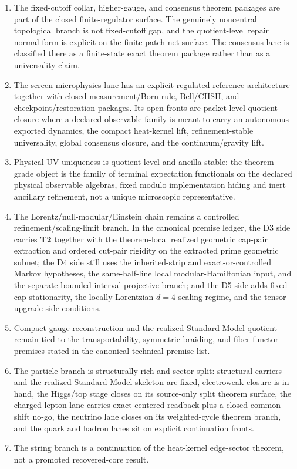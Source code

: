 \begin{enumerate}[leftmargin=2em]
\item The fixed-cutoff collar, higher-gauge, and consensus theorem packages are part of
the closed finite-regulator surface. The genuinely noncentral topological branch is not
fixed-cutoff gap, and the quotient-level repair normal form is explicit on the finite patch-net
surface. The consensus lane is classified there as a finite-state exact theorem package rather
than as a universality claim.
\item The screen-microphysics lane has an explicit regulated reference architecture together
with closed measurement/Born-rule, Bell/CHSH, and checkpoint/restoration packages. Its open fronts
are packet-level quotient closure where a declared observable family is meant to carry an
autonomous exported dynamics, the compact heat-kernel lift, refinement-stable universality,
global consensus closure, and the continuum/gravity lift.
\item Physical UV uniqueness is quotient-level and ancilla-stable: the theorem-grade object is
the family of terminal expectation functionals on the declared physical observable algebras, fixed
modulo implementation hiding and inert ancillary refinement, not a unique microscopic
representative.
\item The Lorentz/null-modular/Einstein chain remains a controlled refinement/scaling-limit
branch. In the canonical premise ledger, the D3 side carries \textbf{T2} together with the
theorem-local realized geometric cap-pair extraction and ordered cut-pair rigidity on the
extracted prime geometric subnet; the D4 side still uses the inherited-strip and
exact-or-controlled Markov hypotheses, the same-half-line local modular-Hamiltonian input, and
the separate bounded-interval projective branch; and the D5 side adds fixed-cap stationarity,
the locally Lorentzian \(d=4\) scaling regime, and the tensor-upgrade side conditions.
\item Compact gauge reconstruction and the realized Standard Model quotient remain tied to the
transportability, symmetric-braiding, and fiber-functor premises stated in the canonical
technical-premise list.
\item The particle branch is structurally rich and sector-split: structural carriers and the
realized Standard Model skeleton are fixed, electroweak closure is in hand, the Higgs/top stage
closes on its source-only split theorem surface, the charged-lepton lane carries exact centered
readback plus a closed common-shift no-go, the neutrino lane closes on its weighted-cycle theorem
branch, and the quark and hadron lanes sit on explicit continuation fronts.
\item The string branch is a continuation of the heat-kernel edge-sector theorem, not a promoted
recovered-core result.
\end{enumerate}

